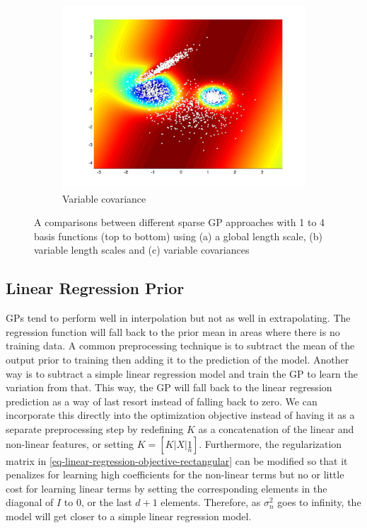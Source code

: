 \documentclass[useAMS,usenatbib,fleqn]{mn2e}
\begin{document}
\begin{figure}
\begin{subfigure}[b]{70 px}
                \includegraphics[trim = 150px 100px 150px 70px, clip=true,width=\textwidth]{VC4.jpg}
                \caption{Variable covariance}
        \end{subfigure}
               
        \caption{A comparisons between different sparse GP approaches with 1 to 4 basis functions (top to bottom) using (a) a global length scale, (b) variable length scales and (c) variable covariances }
        \label{fig-toy-comparison}
\end{figure}

\subsection{Linear Regression Prior}

GPs tend to perform well in interpolation but not as well in extrapolating. The regression function will fall back to the prior mean in areas where there is no training data. A common preprocessing technique is to subtract the mean of the output prior to training then adding it to the prediction of the model. Another way is to subtract a simple linear regression model and train the GP to learn the variation from that. This way, the GP will fall back to the linear regression prediction as a way of last resort instead of falling back to zero. We can incorporate this directly into the optimization objective instead of having it as a separate preprocessing step by redefining $K$ as a concatenation of the linear and non-linear features, or setting $K=[K|X|\underset{n}{1}]$. Furthermore, the regularization matrix in \eqref{eq-linear-regression-objective-rectangular} can be modified so that it penalizes for learning high coefficients for the non-linear terms but no or little cost for learning linear terms by setting the corresponding elements in the diagonal of $I$ to 0, or the last $d+1$ elements. Therefore, as $\sigma_{n}^{2}$ goes to infinity, the model will get closer to a simple linear regression model.
\end{document}
